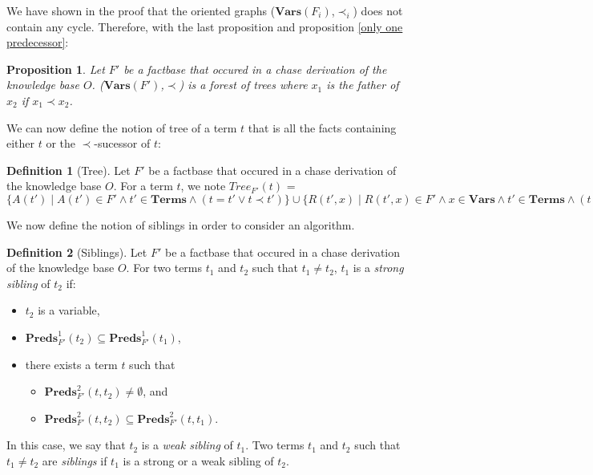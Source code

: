 \documentclass{article}
\newtheorem{proposition}{Proposition}[section]
\theoremstyle{definition}
\newtheorem{definition}{Definition}[section]
\theoremstyle{remark}
\newcommand{\Vars}{\textbf{Vars}}
\newcommand{\Terms}{\textbf{Terms}}
\newcommand{\Preds}{\textbf{Preds}}
\newcommand{\Tree}{\textit{Tree}}
\begin{document}
We have shown in the proof that the oriented graphs ($\Vars(F_i)$,$\prec_i$) does not contain any cycle. Therefore, with the last proposition and proposition \ref{only one predecessor}: 

\begin{proposition}
Let $F'$ be a factbase that occured in a chase derivation of the knowledge base $O$. ($\Vars(F')$,$\prec$) is a forest of trees where $x_1$ is the father of $x_2$ if $x_1 \prec x_2$.
\end{proposition}

We can now define the notion of tree of a term $t$ that is all the facts containing either $t$ or the $\prec$-sucessor of $t$:

\begin{definition}[Tree]
Let $F'$ be a factbase that occured in a chase derivation of the knowledge base $O$. For a term $t$, we note \emph{$\Tree_{F'}(t)$} = $\{A(t') \mid A(t') \in F' \wedge t' \in \Terms \wedge (t = t' \vee t \prec t')\} \cup \{R(t',x) \mid R(t',x) \in F' \wedge x \in \Vars \wedge t' \in \Terms \wedge (t = t' \vee t \prec t')\}$
\end{definition}


%

We now define the notion of siblings in order to consider an algorithm.

\begin{definition}[Siblings]
Let $F'$ be a factbase that occured in a chase derivation of the knowledge base $O$. For two terms $t_1$ and $t_2$ such that $t_1 \neq t_2$, $t_1$ is a \emph{strong sibling} of $t_2$ if:
\begin{itemize}
\item $t_2$ is a variable,
\item $\Preds_{F'}^1(t_2) \subseteq \Preds_{F'}^1(t_1)$,
\item there exists a term $t$ such that
	\begin{itemize}
	\item $\Preds^2_{F'}(t,t_2) \neq \emptyset$, and
	\item $\Preds_{F'}^2(t,t_2) \subseteq \Preds_{F'}^2(t,t_1)$.
	\end{itemize}
\end{itemize}
In this case, we say that  $t_2$ is a \emph{weak sibling} of $t_1$. Two terms $t_1$ and $t_2$ such that $t_1 \neq t_2$ are \emph{siblings} if $t_1$ is a strong or a weak sibling of $t_2$.

\end{definition}
\end{document}
